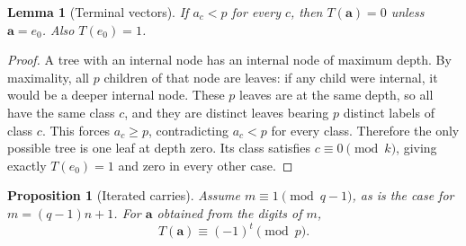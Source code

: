 \documentclass[11pt]{article}
\newtheorem{lemma}[theorem]{Lemma}
\newtheorem{proposition}[theorem]{Proposition}
\theoremstyle{definition}
\theoremstyle{remark}
\numberwithin{equation}{section}
\numberwithin{figure}{section}
\begin{document}
\begin{lemma}[Terminal vectors]\label{main:lem:terminal}
If $a_c<p$ for every $c$, then $T(\mathbf a)=0$ unless $\mathbf a=e_0$.  Also $T(e_0)=1$.
\end{lemma}
\begin{proof}
A tree with an internal node has an internal node of maximum depth.  By maximality, all $p$ children of that node are leaves: if any child were internal, it would be a deeper internal node.  These $p$ leaves are at the same depth, so all have the same class $c$, and they are distinct leaves bearing $p$ distinct labels of class $c$.  This forces $a_c\ge p$, contradicting $a_c<p$ for every class.  Therefore the only possible tree is one leaf at depth zero.  Its class satisfies $c\equiv0\pmod k$, giving exactly $T(e_0)=1$ and zero in every other case.
\end{proof}
\begin{proposition}[Iterated carries]\label{main:prop:carry-termination}
Assume $m\equiv1\pmod{q-1}$, as is the case for $m=(q-1)n+1$.  For $\mathbf a$ obtained from the digits of $m$,
\[
 T(\mathbf a)\equiv(-1)^t\pmod p.
\]
\end{proposition}
\end{document}
